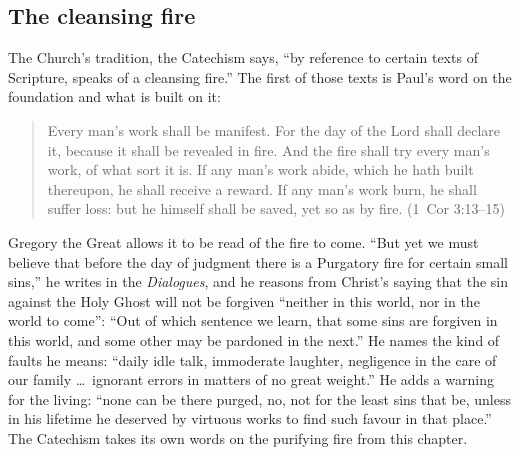 \subsection{The cleansing fire}

The Church's tradition, the Catechism says, ``by reference to certain texts of Scripture, speaks of a cleansing fire.'' The first of those texts is Paul's word on the foundation and what is built on it:

\begin{quote}
Every man's work shall be manifest. For the day of the Lord shall declare it, because it shall be revealed in fire. And the fire shall try every man's work, of what sort it is. If any man's work abide, which he hath built thereupon, he shall receive a reward. If any man's work burn, he shall suffer loss: but he himself shall be saved, yet so as by fire. (1~Cor 3:13--15)
\end{quote}

Gregory the Great allows it to be read of the fire to come. ``But yet we must believe that before the day of judgment there is a Purgatory fire for certain small sins,'' he writes in the \emph{Dialogues}, and he reasons from Christ's saying that the sin against the Holy Ghost will not be forgiven ``neither in this world, nor in the world to come'': ``Out of which sentence we learn, that some sins are forgiven in this world, and some other may be pardoned in the next.'' He names the kind of faults he means: ``daily idle talk, immoderate laughter, negligence in the care of our family \ldots\ ignorant errors in matters of no great weight.'' He adds a warning for the living: ``none can be there purged, no, not for the least sins that be, unless in his lifetime he deserved by virtuous works to find such favour in that place.'' The Catechism takes its own words on the purifying fire from this chapter.

